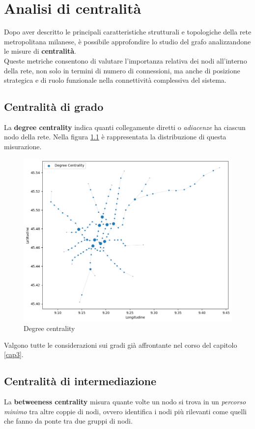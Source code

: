 \chapter{Analisi di centralità}
\label{cap4}
Dopo aver descritto le principali caratteristiche strutturali e topologiche della rete metropolitana milanese, è possibile approfondire lo studio del grafo analizzandone le misure di \textbf{centralità}. \\
Queste metriche consentono di valutare l’importanza relativa dei nodi all’interno della rete, non solo in termini di numero di connessioni, ma anche di posizione strategica e di ruolo funzionale nella connettività complessiva del sistema.

\section{Centralità di grado}
La \textbf{degree centrality} indica quanti collegamente diretti o \textit{adiacenze} ha ciascun nodo della rete. Nella figura \ref{fig: Degree Centrality} è rappresentata la distribuzione di questa misurazione.

\vspace{1em}
\begin{figure}[h!]
    \centering
    \includegraphics[width=0.8\linewidth]{Immagini//Capitoli//cap4/degree_centr.png}
    \caption{Degree centrality}
    \label{fig: Degree Centrality}
\end{figure}
\vspace{1em}

Valgono tutte le considerazioni sui gradi già affrontante nel corso del capitolo \ref{cap3}.


\section{Centralità di intermediazione}
La \textbf{betweeness centrality} misura quante volte un nodo si trova in un \textit{percorso minimo} tra altre coppie di nodi, ovvero identifica i nodi più rilevanti come quelli che fanno da ponte tra due gruppi di nodi.

